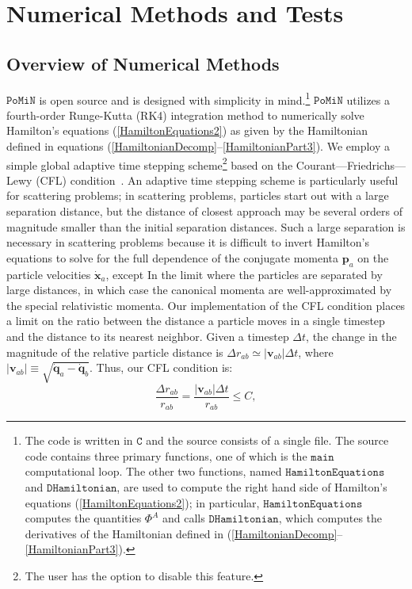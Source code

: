 \documentclass[aps,onecolumn,notitlepage,eqsecnum,nofootinbib,floatfix,superscriptaddress]{revtex4-1}
\newcommand{\codename}{\mathtt{PoMiN}}
\begin{document}
\section{Numerical Methods and Tests}
\subsection{Overview of Numerical Methods}
\label{sec_num_methods}
$\codename$ is open source and is designed with simplicity in mind.\footnote{The code is written in $\mathtt{C}$ and the source consists of a single file. The source code contains three primary functions, one of which is the $\mathtt{main}$ computational loop.  The other two functions, named $\mathtt{HamiltonEquations}$ and $\mathtt{DHamiltonian}$, are used to compute the right hand side of Hamilton's equations (\ref{HamiltonEquations2}); in particular, $\mathtt{HamiltonEquations}$ computes the quantities $\Phi^A$ and calls $\mathtt{DHamiltonian}$, which computes the derivatives of the Hamiltonian defined in (\ref{HamiltonianDecomp}--\ref{HamiltonianPart3}).} $\codename$ utilizes a fourth-order Runge-Kutta (RK4) integration method to numerically solve Hamilton's equations (\ref{HamiltonEquations2}) as given by the Hamiltonian defined in equations (\ref{HamiltonianDecomp}--\ref{HamiltonianPart3}). We employ a simple global adaptive time stepping scheme\footnote{The user has the option to disable this feature.} based on the Courant---Friedrichs---Lewy (CFL) condition~\cite{Courant}. An adaptive time stepping scheme is particularly useful for scattering problems; in scattering problems, particles start out with a large separation distance, but the distance of closest approach may be several orders of magnitude smaller than the initial separation distances. Such a large separation is necessary in scattering problems because it is difficult to invert Hamilton's equations to solve for the full dependence of the conjugate momenta $\textbf{p}_a$ on the particle velocities $\dot{\textbf{x}}_a$, except In the limit where the particles are separated by large distances, in which case the canonical momenta are well-approximated by the special relativistic momenta. Our implementation of the CFL condition places a limit on the ratio between the distance a particle moves in a single timestep and the distance to its nearest neighbor. Given a timestep $\Delta t$, the change in the magnitude of the relative particle distance is $\Delta r_{ab}\simeq |\mathbf{v}_{ab}|\Delta t$, where $|\mathbf{v}_{ab}|\equiv \sqrt{\dot{\mathbf{q}}_{a} - \dot{\mathbf{q}}_{b}}$. Thus, our CFL condition is:
\begin{equation} \label{CFL-Condition}
  \frac{\Delta r_{ab}}{r_{ab}}= \frac{|\mathbf{v}_{ab}|\Delta t}{r_{ab}} \leq C,
\end{equation}
\end{document}
